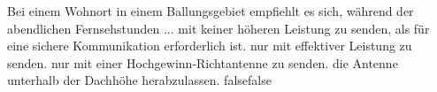     {Bei einem Wohnort in einem Ballungsgebiet empfiehlt es sich, während der abendlichen Fernsehstunden ...}
    {mit keiner höheren Leistung zu senden, als für eine sichere Kommunikation erforderlich ist.}
    {nur mit effektiver Leistung zu senden.}
    {nur mit einer Hochgewinn-Richtantenne zu senden.}
    {die Antenne unterhalb der Dachhöhe herabzulassen.}
    {false}{false}